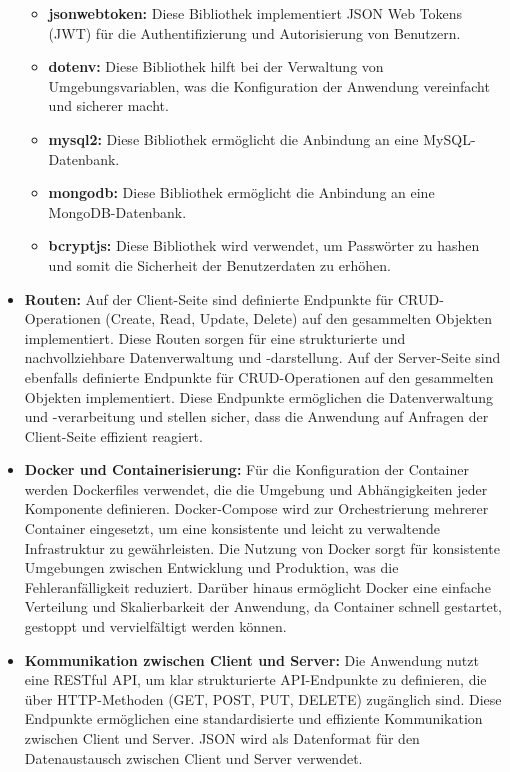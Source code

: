 \begin{itemize}[itemsep=1em, leftmargin=*]
\begin{itemize}[itemsep=1em, leftmargin=*]
        \item \textbf{jsonwebtoken:} Diese Bibliothek implementiert JSON Web Tokens (JWT) für die Authentifizierung und Autorisierung von Benutzern.
        \item \textbf{dotenv:} Diese Bibliothek hilft bei der Verwaltung von Umgebungsvariablen, was die Konfiguration der Anwendung vereinfacht und sicherer macht.
        \item \textbf{mysql2:} Diese Bibliothek ermöglicht die Anbindung an eine MySQL-Datenbank.
        \item \textbf{mongodb:} Diese Bibliothek ermöglicht die Anbindung an eine MongoDB-Datenbank.
        \item \textbf{bcryptjs:} Diese Bibliothek wird verwendet, um Passwörter zu hashen und somit die Sicherheit der Benutzerdaten zu erhöhen.
    \end{itemize}
    \item \textbf{Routen:} Auf der Client-Seite sind definierte Endpunkte für CRUD-Operationen (Create, Read, Update, Delete) auf den gesammelten Objekten implementiert.
    Diese Routen sorgen für eine strukturierte und nachvollziehbare Datenverwaltung und -darstellung.
    Auf der Server-Seite sind ebenfalls definierte Endpunkte für CRUD-Operationen auf den gesammelten Objekten implementiert.
    Diese Endpunkte ermöglichen die Datenverwaltung und -verarbeitung und stellen sicher, dass die Anwendung auf Anfragen der Client-Seite effizient reagiert.
    \item \textbf{Docker und Containerisierung:} Für die Konfiguration der Container werden Dockerfiles verwendet, die die Umgebung und Abhängigkeiten jeder Komponente definieren.
    Docker-Compose wird zur Orchestrierung mehrerer Container eingesetzt, um eine konsistente und leicht zu verwaltende Infrastruktur zu gewährleisten.
    Die Nutzung von Docker sorgt für konsistente Umgebungen zwischen Entwicklung und Produktion, was die Fehleranfälligkeit reduziert.
    Darüber hinaus ermöglicht Docker eine einfache Verteilung und Skalierbarkeit der Anwendung, da Container schnell gestartet, gestoppt und vervielfältigt werden können.
    \item \textbf{Kommunikation zwischen Client und Server:} Die Anwendung nutzt eine RESTful API, um klar strukturierte API-Endpunkte zu definieren, die über HTTP-Methoden (GET, POST, PUT, DELETE) zugänglich sind.
    Diese Endpunkte ermöglichen eine standardisierte und effiziente Kommunikation zwischen Client und Server.
    JSON wird als Datenformat für den Datenaustausch zwischen Client und Server verwendet.

\end{itemize}

